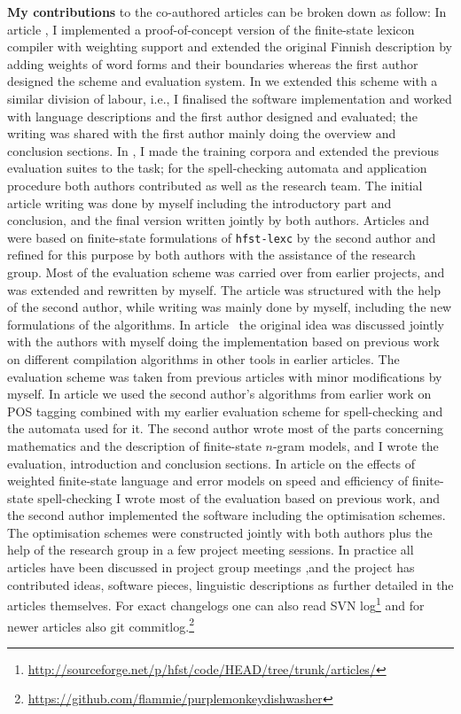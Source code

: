 \documentclass[officiallayout,final]{unihelcompling}
\begin{document}
\textbf{My contributions} to the co-authored articles can be broken down as
follow: In article , I implemented a
proof-of-concept version of the finite-state lexicon compiler with weighting
support and extended the original Finnish description by adding weights of word
forms and their boundaries whereas the first author designed the scheme and
evaluation system. In  we extended this scheme
with a similar division of labour, i.e., I finalised the software
implementation and worked with language descriptions and the first author
designed and evaluated; the writing was shared with the first author mainly
doing the overview and conclusion sections. In
, I made the training corpora and extended
the previous evaluation suites to the task; for the spell-checking automata and
application procedure both authors contributed as well as the research team.
The initial article writing was done by myself including the introductory part
and conclusion, and the final version written jointly by both authors. Articles
 and  were
based on finite-state formulations of \texttt{hfst-lexc} by the second author
and refined for this purpose by both authors with the assistance of the
research group. Most of the evaluation scheme was carried over from earlier
projects, and was extended and rewritten by myself. The article was structured
with the help of the second author, while writing was mainly done by myself,
including the new formulations of the algorithms. In
article~ the original idea was discussed
jointly with the authors with myself doing the implementation based on previous
work on different compilation algorithms in other tools in earlier articles.
The evaluation scheme was taken from previous articles with minor modifications
by myself. In article  we used the second
author's algorithms from earlier work on POS tagging combined with my earlier
evaluation scheme for spell-checking and the automata used for it.  The second
author wrote most of the parts concerning mathematics and the description of
finite-state \(n\)-gram models, and I wrote the evaluation, introduction and
conclusion sections. In article  on the effects
of weighted finite-state language and error models on speed and efficiency of
finite-state spell-checking I wrote most of the evaluation based on previous
work, and the second author implemented the software including the optimisation
schemes. The optimisation schemes were constructed jointly with both authors
plus the help of the research group in a few project meeting sessions.  In
practice all articles have been discussed in project group meetings ,and the
project has contributed ideas, software pieces, linguistic descriptions as
further detailed in the articles themselves. For exact changelogs one can also
read SVN
log\footnote{\url{http://sourceforge.net/p/hfst/code/HEAD/tree/trunk/articles/}}
and for newer articles also git
commitlog.\footnote{\url{https://github.com/flammie/purplemonkeydishwasher}}
\end{document}
